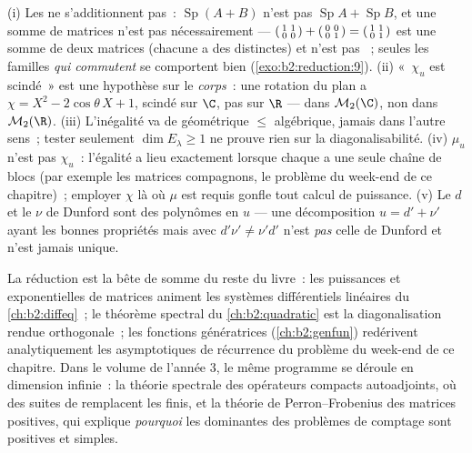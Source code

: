 \begin{remark}\label{rem:b2:reduction:pitfalls}
(i) Les  ne s'additionnent pas~:
$\operatorname{Sp}(A + B)$ n'est pas $\operatorname{Sp}A +
\operatorname{Sp}B$, et une somme de matrices  n'est
pas nécessairement  ---
$\begin{psmallmatrix}1 & 1\\ 0 & 0\end{psmallmatrix} +
\begin{psmallmatrix}0 & 0\\ 0 & 1\end{psmallmatrix} =
\begin{psmallmatrix}1 & 1\\ 0 & 1\end{psmallmatrix}$ est une somme de
deux matrices  (chacune a des 
distinctes) et n'est pas ~; seules les familles
\emph{qui commutent} se comportent bien
(\cref{exo:b2:reduction:9}). (ii) «~$\chi_u$ est scindé~» est une
hypothèse sur le \emph{corps}~: une rotation du plan a $\chi = X^2 -
2\cos\theta\,X + 1$, scindé sur $\C$, pas sur $\R$ --- 
dans $\mathcal{M}_2(\C)$, non  dans $\mathcal{M}_2(\R)$.
(iii) L'inégalité va de géométrique $\leq$ algébrique, jamais dans
l'autre sens~; tester seulement $\dim E_\lambda \geq 1$ ne prouve rien
sur la diagonalisabilité. (iv) $\mu_u$ n'est pas $\chi_u$~: l'égalité
a lieu exactement lorsque chaque  a une seule chaîne de
blocs (par exemple les matrices compagnons, le problème du week-end de
ce chapitre)~; employer $\chi$ là où $\mu$ est requis gonfle tout
calcul de puissance. (v) Le $d$ et le $\nu$ de Dunford sont des
polynômes en $u$ --- une décomposition $u = d' + \nu'$ ayant les
bonnes propriétés mais avec $d'\nu' \neq \nu'd'$ n'est \emph{pas}
celle de Dunford et n'est jamais unique.
\end{remark}

\begin{remark}
La réduction est la bête de somme du reste du livre~: les puissances
et exponentielles de matrices animent les systèmes différentiels
linéaires du \cref{ch:b2:diffeq}~; le théorème spectral du
\cref{ch:b2:quadratic} est la diagonalisation rendue orthogonale~; les
fonctions génératrices (\cref{ch:b2:genfun}) redérivent
analytiquement les asymptotiques de récurrence du problème du week-end
de ce chapitre. Dans le volume de l'année 3, le même programme se
déroule en dimension infinie~: la théorie spectrale des opérateurs
compacts autoadjoints, où des suites de  remplacent les
 finis, et la théorie de Perron--Frobenius des matrices
positives, qui explique \emph{pourquoi} les  dominantes
des problèmes de comptage sont positives et simples.
\end{remark}

